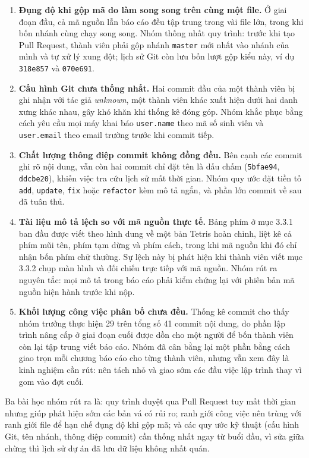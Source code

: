 \begin{enumerate}
    \item \textbf{Đụng độ khi gộp mã do làm song song trên cùng một file.} Ở giai đoạn đầu, cả mã nguồn lẫn báo cáo đều tập trung trong vài file lớn, trong khi bốn nhánh cùng chạy song song. Nhóm thống nhất quy trình: trước khi tạo Pull Request, thành viên phải gộp nhánh \texttt{master} mới nhất vào nhánh của mình và tự xử lý xung đột; lịch sử Git còn lưu bốn lượt gộp kiểu này, ví dụ \texttt{318e857} và \texttt{070e691}.

    \item \textbf{Cấu hình Git chưa thống nhất.} Hai commit đầu của một thành viên bị ghi nhận với tác giả \textit{unknown}, một thành viên khác xuất hiện dưới hai danh xưng khác nhau, gây khó khăn khi thống kê đóng góp. Nhóm khắc phục bằng cách yêu cầu mọi máy khai báo \texttt{user.name} theo mã số sinh viên và \texttt{user.email} theo email trường trước khi commit tiếp.

    \item \textbf{Chất lượng thông điệp commit không đồng đều.} Bên cạnh các commit ghi rõ nội dung, vẫn còn hai commit chỉ đặt tên là dấu chấm (\texttt{5bfae94}, \texttt{ddcbe20}), khiến việc tra cứu lịch sử mất thời gian. Nhóm quy ước đặt tiền tố \texttt{add}, \texttt{update}, \texttt{fix} hoặc \texttt{refactor} kèm mô tả ngắn, và phần lớn commit về sau đã tuân thủ.

    \item \textbf{Tài liệu mô tả lệch so với mã nguồn thực tế.} Bảng phím ở mục 3.3.1 ban đầu được viết theo hình dung về một bản Tetris hoàn chỉnh, liệt kê cả phím mũi tên, phím tạm dừng và phím cách, trong khi mã nguồn khi đó chỉ nhận bốn phím chữ thường. Sự lệch này bị phát hiện khi thành viên viết mục 3.3.2 chụp màn hình và đối chiếu trực tiếp với mã nguồn. Nhóm rút ra nguyên tắc: mọi mô tả trong báo cáo phải kiểm chứng lại với phiên bản mã nguồn hiện hành trước khi nộp.

    \item \textbf{Khối lượng công việc phân bố chưa đều.} Thống kê commit cho thấy nhóm trưởng thực hiện 29 trên tổng số 41 commit nội dung, do phần lập trình nâng cấp ở giai đoạn cuối được dồn cho một người để bốn thành viên còn lại tập trung viết báo cáo. Nhóm đã cân bằng lại một phần bằng cách giao trọn mỗi chương báo cáo cho từng thành viên, nhưng vẫn xem đây là kinh nghiệm cần rút: nên tách nhỏ và giao sớm các đầu việc lập trình thay vì gom vào đợt cuối.
\end{enumerate}

Ba bài học nhóm rút ra là: quy trình duyệt qua Pull Request tuy mất thời gian nhưng giúp phát hiện sớm các bản vá có rủi ro; ranh giới công việc nên trùng với ranh giới file để hạn chế đụng độ khi gộp mã; và các quy ước kỹ thuật (cấu hình Git, tên nhánh, thông điệp commit) cần thống nhất ngay từ buổi đầu, vì sửa giữa chừng thì lịch sử dự án đã lưu dữ liệu không nhất quán.
